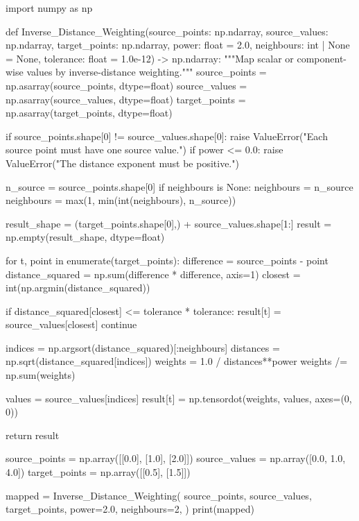 \begin{python}
import numpy as np


def Inverse_Distance_Weighting(source_points: np.ndarray,
                               source_values: np.ndarray,
                               target_points: np.ndarray,
                               power: float = 2.0,
                               neighbours: int | None = None,
                               tolerance: float = 1.0e-12) -> np.ndarray:
    """Map scalar or component-wise values by inverse-distance weighting."""
    source_points = np.asarray(source_points, dtype=float)
    source_values = np.asarray(source_values, dtype=float)
    target_points = np.asarray(target_points, dtype=float)

    if source_points.shape[0] != source_values.shape[0]:
        raise ValueError("Each source point must have one source value.")
    if power <= 0.0:
        raise ValueError("The distance exponent must be positive.")

    n_source = source_points.shape[0]
    if neighbours is None:
        neighbours = n_source
    neighbours = max(1, min(int(neighbours), n_source))

    result_shape = (target_points.shape[0],) + source_values.shape[1:]
    result = np.empty(result_shape, dtype=float)

    for t, point in enumerate(target_points):
        difference = source_points - point
        distance_squared = np.sum(difference * difference, axis=1)
        closest = int(np.argmin(distance_squared))

        if distance_squared[closest] <= tolerance * tolerance:
            result[t] = source_values[closest]
            continue

        indices = np.argsort(distance_squared)[:neighbours]
        distances = np.sqrt(distance_squared[indices])
        weights = 1.0 / distances**power
        weights /= np.sum(weights)

        values = source_values[indices]
        result[t] = np.tensordot(weights, values, axes=(0, 0))

    return result


source_points = np.array([[0.0], [1.0], [2.0]])
source_values = np.array([0.0, 1.0, 4.0])
target_points = np.array([[0.5], [1.5]])

mapped = Inverse_Distance_Weighting(
    source_points,
    source_values,
    target_points,
    power=2.0,
    neighbours=2,
)
print(mapped)
\end{python}

